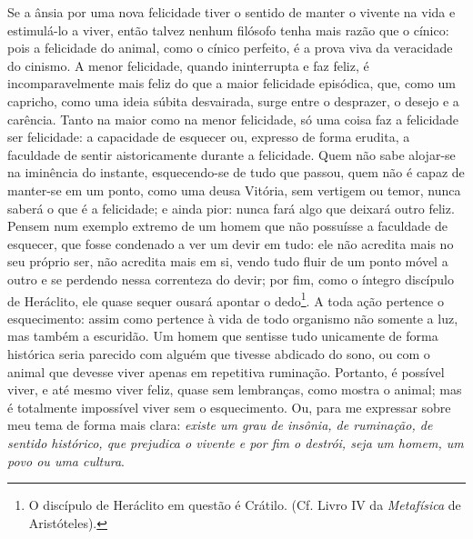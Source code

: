 Se a ânsia por uma nova felicidade tiver o sentido de
manter o vivente na vida e estimulá-lo a viver, então talvez nenhum
filósofo tenha mais razão que o cínico: pois a felicidade do animal,
como o cínico perfeito, é a prova viva da veracidade do cinismo. A menor
felicidade, quando ininterrupta e faz feliz, é incomparavelmente mais
feliz do que a maior felicidade episódica, que, como um capricho, como
uma ideia súbita desvairada, surge entre o desprazer, o desejo e a
carência. Tanto na maior como na menor felicidade, só uma coisa faz a
felicidade ser felicidade: a capacidade de esquecer ou, expresso de
forma erudita, a faculdade de sentir aistoricamente durante a
felicidade. Quem não sabe alojar-se na iminência do instante,
esquecendo-se de tudo que passou, quem não é capaz de manter-se em um
ponto, como uma deusa Vitória, sem vertigem ou temor, nunca saberá o que
é a felicidade; e ainda pior: nunca fará algo que deixará outro feliz.
Pensem num exemplo extremo de um homem que não possuísse a faculdade de
esquecer, que fosse condenado a ver um devir em tudo: ele não acredita
mais no seu próprio ser, não acredita mais em si, vendo tudo fluir de um
ponto móvel a outro e se perdendo nessa correnteza do devir; por fim,
como o íntegro discípulo de Heráclito, ele quase sequer ousará apontar o
dedo\footnote{O discípulo de Heráclito em questão é Crátilo. (Cf. Livro
  IV da \emph{Metafísica} de Aristóteles).}. A toda ação pertence o
esquecimento: assim como pertence à vida de todo organismo não somente a
luz, mas também a escuridão. Um homem que sentisse tudo unicamente de
forma histórica seria parecido com alguém que tivesse abdicado do sono,
ou com o animal que devesse viver apenas em repetitiva ruminação.
Portanto, é possível viver, e até mesmo viver feliz, quase sem
lembranças, como mostra o animal; mas é totalmente impossível viver sem
o esquecimento. Ou, para me expressar sobre meu tema de forma mais
clara: \emph{existe um grau de insônia, de ruminação, de sentido
histórico, que prejudica o vivente e por fim o destrói, seja um homem,
um povo ou uma cultura}.

